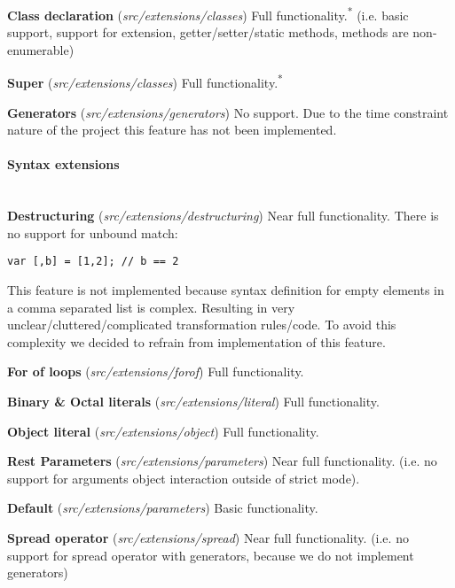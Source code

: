 \textbf{Class declaration} (\textit{src/extensions/classes}) \newline
Full functionality.\textsuperscript{*} (i.e. basic support, support for extension, getter/setter/static methods, methods are non-enumerable)

\textbf{Super} (\textit{src/extensions/classes}) \newline
Full functionality.\textsuperscript{*}

\textbf{Generators} (\textit{src/extensions/generators}) \newline
No support. Due to the time constraint nature of the project this feature has not been implemented. 

\paragraph{Syntax extensions}\mbox{}\\
\textbf{Destructuring} (\textit{src/extensions/destructuring}) \newline
Near full functionality. There is no support for unbound match:
\begin{lstlisting}
var [,b] = [1,2]; // b == 2
\end{lstlisting}
This feature is not implemented because syntax definition for empty elements in a comma separated list is complex. Resulting in very unclear/cluttered/complicated transformation rules/code. To avoid this complexity we decided to refrain from implementation of this feature.

\textbf{For of loops} (\textit{src/extensions/forof}) \newline
Full functionality.

\textbf{Binary \& Octal literals} (\textit{src/extensions/literal}) \newline
Full functionality.

\textbf{Object literal} (\textit{src/extensions/object}) \newline
Full functionality.

\textbf{Rest Parameters} (\textit{src/extensions/parameters}) \newline
Near full functionality. (i.e. no support for arguments object interaction outside of strict mode).

\textbf{Default} (\textit{src/extensions/parameters}) \newline
Basic functionality.

\textbf{Spread operator} (\textit{src/extensions/spread}) \newline
Near full functionality. (i.e. no support for spread operator with generators, because we do not implement generators)

